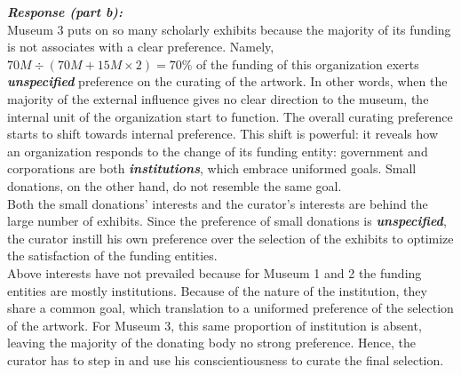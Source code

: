 \documentclass[12pt]{article}
\newcommand\tab[1][1cm]{\hspace*{#1}}
\begin{document}
\textbf{\emph{Response (part b): }} \\
\tab Museum 3 puts on so many scholarly exhibits because the majority of its funding is not associates with a clear preference. Namely, $70M \div (70M + 15M \times 2) = 70\%$ of the funding of this organization exerts \textbf{\emph{unspecified}} preference on the curating of the artwork. In other words, when the majority of the external influence gives no clear direction to the museum, the internal unit of the organization start to function. The overall curating preference starts to shift towards internal preference. This shift is powerful: it reveals how an organization responds to the change of its funding entity: government and corporations are both \textbf{\emph{institutions}}, which embrace uniformed goals. Small donations, on the other hand, do not resemble the same goal. \\
\tab Both the small donations' interests and the curator's interests are behind the large number of exhibits. Since the preference of small donations is \textbf{\emph{unspecified}}, the curator instill his own preference over the selection of the exhibits to optimize the satisfaction of the funding entities.  \\
\tab Above interests have not prevailed because for Museum 1 and 2 the funding entities are mostly institutions. Because of the nature of the institution, they share a common goal, which translation to a uniformed preference of the selection of the artwork. For Museum 3, this same proportion of institution is absent, leaving the majority of the donating body no strong preference. Hence, the curator has to step in and use his conscientiousness to curate the final selection.

\pagebreak
\end{document}
